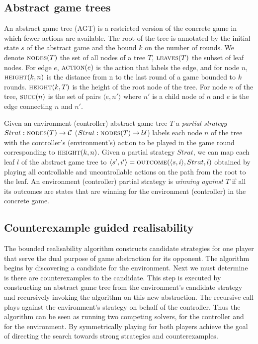 \subsection{Abstract game trees}

An abstract game tree (AGT) is a restricted version of the concrete game in which fewer actions are available. The root of the tree is annotated by the initial state $s$ of the abstract game and the bound $k$ on the number of rounds.  We denote $\textsc{nodes}(T)$ the set of all nodes of a tree $T$, $\textsc{leaves}(T)$ the subset of leaf nodes.  For edge $e$, $\textsc{action}(e)$ is the action that labels the edge, and for node $n$, $\textsc{height}(k, n)$ is the distance from n to the last round of a game bounded to $k$ rounds.  $\textsc{height}(k, T)$ is the height of the root node of the tree.  For node $n$ of the tree, $\textsc{succ}(n)$ is the set of pairs $\langle e, n' \rangle$ where $n'$ is a child node of $n$ and $e$ is the edge connecting $n$ and $n'$.

Given an environment (controller) abstract game tree $T$ a \emph{partial strategy} $Strat: \textsc{nodes}(T) \rightarrow \mathcal{C}$ ($Strat: \textsc{nodes}(T) \rightarrow \mathcal{U}$) labels each node $n$ of the tree with the controller's (environment's) action to be played in the game round corresponding to $\textsc{height}(k, n)$.  Given a partial strategy $Strat$, we can map each leaf $l$ of the abstract game tree to $\langle s',i'\rangle=\textsc{outcome}(\langle s, i\rangle, Strat, l)$ obtained by playing all controllable and uncontrollable actions on the path from the root to the leaf.  An environment (controller) partial strategy is \emph{winning against $T$} if all its outcomes are states that are winning for the environment (controller) in the concrete game.

\subsection{Counterexample guided realisability}

The bounded realisability algorithm constructs candidate strategies for one player that serve the dual purpose of game abstraction for its opponent. The algorithm begins by discovering a candidate for the environment. Next we must determine is there are counterexamples to the candidate. This step is executed by constructing an abstract game tree from the environment's candidate strategy and recursively invoking the algorithm on this new abstraction. The recursive call plays against the environment's strategy on behalf of the controller. Thus the algorithm can be seen as running two competing solvers, for the controller and for the environment. By symmetrically playing for both players achieve the goal of directing the search towards strong strategies and counterexamples.

